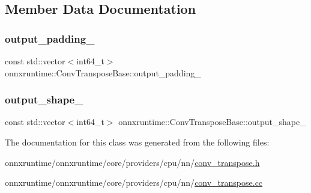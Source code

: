 \subsection{Member Data Documentation}
\mbox{\label{classonnxruntime_1_1ConvTransposeBase_a22c5311310fb05d751163a532a3ff888}} 
\subsubsection{\texorpdfstring{output\+\_\+padding\+\_\+}{output\_padding\_}}
{\footnotesize\ttfamily const std\+::vector$<$int64\+\_\+t$>$ onnxruntime\+::\+Conv\+Transpose\+Base\+::output\+\_\+padding\+\_\+\hspace{0.3cm}{\ttfamily [protected]}}

\mbox{\label{classonnxruntime_1_1ConvTransposeBase_aecdb70a060732461de425a07f978c455}} 
\subsubsection{\texorpdfstring{output\+\_\+shape\+\_\+}{output\_shape\_}}
{\footnotesize\ttfamily const std\+::vector$<$int64\+\_\+t$>$ onnxruntime\+::\+Conv\+Transpose\+Base\+::output\+\_\+shape\+\_\+\hspace{0.3cm}{\ttfamily [protected]}}



The documentation for this class was generated from the following files\+:\begin{DoxyCompactItemize}
\item 
onnxruntime/onnxruntime/core/providers/cpu/nn/\mbox{\hyperlink{cpu_2nn_2conv__transpose_8h}{conv\+\_\+transpose.\+h}}\item 
onnxruntime/onnxruntime/core/providers/cpu/nn/\mbox{\hyperlink{cpu_2nn_2conv__transpose_8cc}{conv\+\_\+transpose.\+cc}}\end{DoxyCompactItemize}
